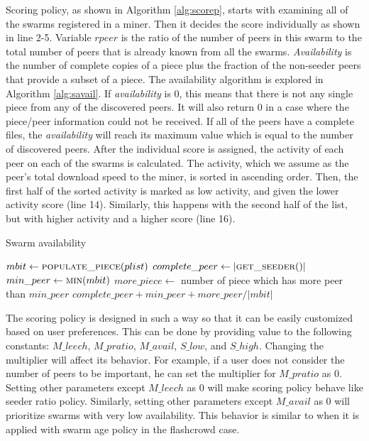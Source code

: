 Scoring policy, as shown in Algorithm \ref{alg:scorep}, starts with examining all of the swarms registered in a miner. Then it decides the score individually as shown in line 2-5. Variable $rpeer$ is the ratio of the number of peers in this swarm to the total number of peers that is already known from all the swarms. \textit{Availability} is the number of complete copies of a piece plus the fraction of the non-seeder peers that provide a subset of a piece. The availability algorithm is explored in Algorithm \ref{alg:savail}. If \textit{availability} is 0, this means that there is not any single piece from any of the discovered peers. It will also return 0 in a case where the piece/peer information could not be received. If all of the peers have a complete files, the \textit{availability} will reach its maximum value which is equal to the number of discovered peers. After the individual score is assigned, the activity of each peer on each of the swarms is calculated. The activity, which we assume as the peer's total download speed to the miner, is sorted in ascending order. Then, the first half of the sorted activity is marked as low activity, and given the lower activity score (line 14). Similarly, this happens with the second half of the list, but with higher activity and a higher score (line 16).

\begin{algorithm}[h]
	\caption{Swarm availability}
	\label{alg:savail}
	\begin{algorithmic}[1]
		\State $mbit \gets \Call{populate\_piece}{plist}$
		\State $complete\_peer \gets |\Call{get\_seeder}{\null}|$ 
		\State $min\_peer \gets \Call{min}{mbit}$
		\State $more\_piece \gets $ number of piece which has more peer than $min\_peer$
		\State \Return $complete\_peer + min\_peer + more\_peer/|mbit|$
	\end{algorithmic}
\end{algorithm}

The scoring policy is designed in such a way so that it can be easily customized based on user preferences. This can be done by providing value to the following constants: $M\_leech$, $M\_pratio$, $M\_avail$, $S\_low$, and $S\_high$. Changing the multiplier will affect its behavior. For example, if a user does not consider the number of peers to be important, he can set the multiplier for $M\_pratio$ as 0. Setting other parameters except $M\_leech$ as 0 will make scoring policy behave like seeder ratio policy. Similarly, setting other parameters except $M\_avail$ as 0 will prioritize swarms with very low availability. This behavior is similar to when it is applied with swarm age policy in the flashcrowd case.

